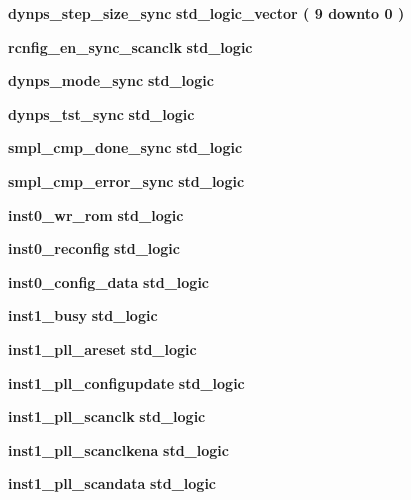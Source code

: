 \begin{DoxyCompactItemize}
\item 
{\bf dynps\+\_\+step\+\_\+size\+\_\+sync} {\bfseries \textcolor{comment}{std\+\_\+logic\+\_\+vector}\textcolor{vhdlchar}{ }\textcolor{vhdlchar}{(}\textcolor{vhdlchar}{ }\textcolor{vhdlchar}{ } \textcolor{vhdldigit}{9} \textcolor{vhdlchar}{ }\textcolor{keywordflow}{downto}\textcolor{vhdlchar}{ }\textcolor{vhdlchar}{ } \textcolor{vhdldigit}{0} \textcolor{vhdlchar}{ }\textcolor{vhdlchar}{)}\textcolor{vhdlchar}{ }} 
\item 
{\bf rcnfig\+\_\+en\+\_\+sync\+\_\+scanclk} {\bfseries \textcolor{comment}{std\+\_\+logic}\textcolor{vhdlchar}{ }} 
\item 
{\bf dynps\+\_\+mode\+\_\+sync} {\bfseries \textcolor{comment}{std\+\_\+logic}\textcolor{vhdlchar}{ }} 
\item 
{\bf dynps\+\_\+tst\+\_\+sync} {\bfseries \textcolor{comment}{std\+\_\+logic}\textcolor{vhdlchar}{ }} 
\item 
{\bf smpl\+\_\+cmp\+\_\+done\+\_\+sync} {\bfseries \textcolor{comment}{std\+\_\+logic}\textcolor{vhdlchar}{ }} 
\item 
{\bf smpl\+\_\+cmp\+\_\+error\+\_\+sync} {\bfseries \textcolor{comment}{std\+\_\+logic}\textcolor{vhdlchar}{ }} 
\item 
{\bf inst0\+\_\+wr\+\_\+rom} {\bfseries \textcolor{comment}{std\+\_\+logic}\textcolor{vhdlchar}{ }} 
\item 
{\bf inst0\+\_\+reconfig} {\bfseries \textcolor{comment}{std\+\_\+logic}\textcolor{vhdlchar}{ }} 
\item 
{\bf inst0\+\_\+config\+\_\+data} {\bfseries \textcolor{comment}{std\+\_\+logic}\textcolor{vhdlchar}{ }} 
\item 
{\bf inst1\+\_\+busy} {\bfseries \textcolor{comment}{std\+\_\+logic}\textcolor{vhdlchar}{ }} 
\item 
{\bf inst1\+\_\+pll\+\_\+areset} {\bfseries \textcolor{comment}{std\+\_\+logic}\textcolor{vhdlchar}{ }} 
\item 
{\bf inst1\+\_\+pll\+\_\+configupdate} {\bfseries \textcolor{comment}{std\+\_\+logic}\textcolor{vhdlchar}{ }} 
\item 
{\bf inst1\+\_\+pll\+\_\+scanclk} {\bfseries \textcolor{comment}{std\+\_\+logic}\textcolor{vhdlchar}{ }} 
\item 
{\bf inst1\+\_\+pll\+\_\+scanclkena} {\bfseries \textcolor{comment}{std\+\_\+logic}\textcolor{vhdlchar}{ }} 
\item 
{\bf inst1\+\_\+pll\+\_\+scandata} {\bfseries \textcolor{comment}{std\+\_\+logic}\textcolor{vhdlchar}{ }} 

\end{DoxyCompactItemize}
